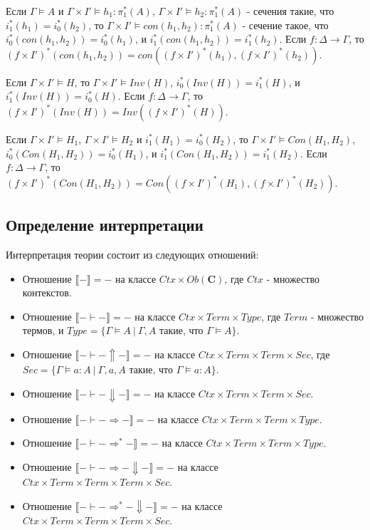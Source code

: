 \documentclass{amsart}
\theoremstyle{definition}
\theoremstyle{remark}
\newcommand{\red}{\Rightarrow}
\renewcommand{\ll}{\llbracket}
\newcommand{\rr}{\rrbracket}
\newcommand{\cat}[1]{\mathbf{#1}}
\renewcommand{\C}{\cat{C}}
\numberwithin{figure}{section}
\begin{document}
Если $\Gamma \models A$ и $\Gamma \times I' \models h_1 : \pi_1^*(A)$, $\Gamma \times I' \models h_2 : \pi_1^*(A)$ - сечения такие, что $i_1^*(h_1) = i_0^*(h_2)$, то $\Gamma \times I' \models con(h_1, h_2) : \pi_1^*(A)$ - сечение такое, что $i_0^*(con(h_1, h_2)) = i_0^*(h_1)$, и $i_1^*(con(h_1, h_2)) = i_1^*(h_2)$.
Если $f : \Delta \to \Gamma$, то $(f \times I')^*(con(h_1, h_2)) = con((f \times I')^*(h_1), (f \times I')^*(h_2))$.

Если $\Gamma \times I' \models H$, то $\Gamma \times I' \models Inv(H)$, $i_0^*(Inv(H)) = i_1^*(H)$, и $i_1^*(Inv(H)) = i_0^*(H)$.
Если $f : \Delta \to \Gamma$, то $(f \times I')^*(Inv(H)) = Inv((f \times I')^*(H))$.

Если $\Gamma \times I' \models H_1$, $\Gamma \times I' \models H_2$ и $i_1^*(H_1) = i_0^*(H_2)$, то $\Gamma \times I' \models Con(H_1, H_2)$, $i_0^*(Con(H_1, H_2)) = i_0^*(H_1)$, и $i_1^*(Con(H_1, H_2)) = i_1^*(H_2)$.
Если $f : \Delta \to \Gamma$, то $(f \times I')^*(Con(H_1, H_2)) = Con((f \times I')^*(H_1), (f \times I')^*(H_2))$.

\subsection{Определение интерпретации}

Интерпретация теории состоит из следующих отношений:
\begin{itemize}
\item Отношение $\ll - \rr = -$ на классе $Ctx \times Ob(\C)$, где $Ctx$ - множество контекстов.
\item Отношение $\ll - \vdash - \rr = -$ на классе $Ctx \times Term \times Type$, где $Term$ - множество термов, и $Type = \{ \Gamma \models A\ |\ \Gamma, A \text{ такие, что } \Gamma \models A \}$.
\item Отношение $\ll - \vdash - \Uparrow - \rr = -$ на классе $Ctx \times Term \times Term \times Sec$, где $Sec = \{ \Gamma \models a : A\ |\ \Gamma, a, A \text{ такие, что } \Gamma \models a : A \}$.
\item Отношение $\ll - \vdash - \Downarrow - \rr = -$ на классе $Ctx \times Term \times Term \times Sec$.
\item Отношение $\ll - \vdash - \red - \rr = -$ на классе $Ctx \times Term \times Term \times Type$.
\item Отношение $\ll - \vdash - \red^* - \rr = -$ на классе $Ctx \times Term \times Term \times Type$.
\item Отношение $\ll - \vdash - \red - \Downarrow - \rr = -$ на классе $Ctx \times Term \times Term \times Term \times Sec$.
\item Отношение $\ll - \vdash - \red^* - \Downarrow - \rr = -$ на классе $Ctx \times Term \times Term \times Term \times Sec$.
\end{itemize}
\end{document}
